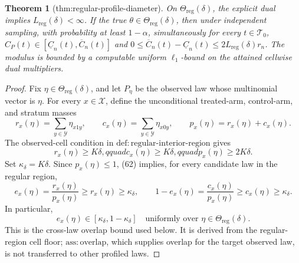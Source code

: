 \documentclass{article}
\newtheorem{theorem}{Theorem}
\begin{document}
\begin{theorem}[thm:regular-profile-diameter]\label{thm:regular-profile-diameter}
On \(\Theta_{\mathrm{reg}}(\delta)\), the explicit dual implies \(L_{\mathrm{reg}}(\delta)<\infty\). If the true \(\theta\in\Theta_{\mathrm{reg}}(\delta)\), then under independent sampling, with probability at least \(1-\alpha\), simultaneously for every \(t\in\mathcal T_0\), \(C_P(t)\in[\underline C_n(t),\overline C_n(t)]\) and \(0\leq\overline C_n(t)-\underline C_n(t)\leq2L_{\mathrm{reg}}(\delta)r_n\). The modulus is bounded by a computable uniform \(\ell_1\)-bound on the attained cellwise dual multipliers.
\end{theorem}
\begin{proof}
Fix \(\eta\in\Theta_{\mathrm{reg}}(\delta)\), and let \(P_\eta\) be the observed law whose multinomial vector is \(\eta\).  For every \(x\in\mathcal X\), define the unconditional treated-arm, control-arm, and stratum masses
\[
r_x(\eta)=\sum_{y\in\mathcal Y}\eta_{x1y},\qquad
c_x(\eta)=\sum_{y\in\mathcal Y}\eta_{x0y},\qquad
p_x(\eta)=r_x(\eta)+c_x(\eta).
\tag{61}
\]
The observed-cell condition in \(\mathrm{def{:}regular\mbox{-}interior\mbox{-}region}\) gives
\[
r_x(\eta)\geq K\delta,qquad
c_x(\eta)\geq K\delta,qquad
p_x(\eta)\geq2K\delta.
\tag{62}
\]
Set \(\kappa_\delta=K\delta\).  Since \(p_x(\eta)\leq1\), (62) implies, for every candidate law in the regular region,
\[
e_x(\eta)=\frac{r_x(\eta)}{p_x(\eta)}
\geq r_x(\eta)\geq\kappa_\delta,
\qquad
1-e_x(\eta)=\frac{c_x(\eta)}{p_x(\eta)}
\geq c_x(\eta)\geq\kappa_\delta.
\tag{63}
\]
In particular,
\[
e_x(\eta)\in[\kappa_\delta,1-\kappa_\delta]
\quad\text{uniformly over }\eta\in\Theta_{\mathrm{reg}}(\delta).
\tag{64}
\]
This is the cross-law overlap bound used below.  It is derived from the regular-region cell floor; \(\mathrm{ass{:}overlap}\), which supplies overlap for the target observed law, is not transferred to other profiled laws.


\end{proof}
\end{document}
